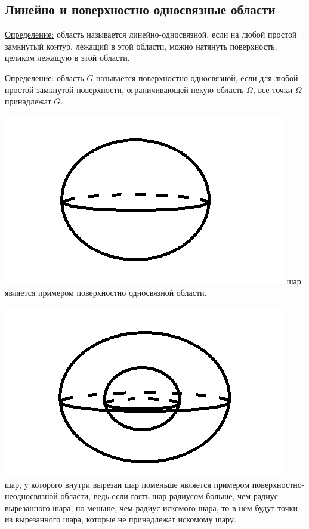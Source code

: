 \documentclass[12pt]{article}
\begin{document}
\subsection{Линейно и поверхностно односвязные области}
\uline{Определение:} область называется линейно-односвязной, если на любой простой замкнутый контур, лежащий в этой области, можно натянуть поверхность, целиком лежащую в этой области.\par
\uline{Определение:} область $G$ называется поверхностно-односвязной, если для любой простой замкнутой поверхности, ограничивающей некую область $\Omega$, все точки $\Omega$ принадлежат $G$.\par
\includegraphics{surfaceSingleConnected1}  шар является примером поверхностно односвязной области.\par
\includegraphics{surfaceNotSingleConnected1} - шар, у которого внутри вырезан шар поменьше является примером поверхностно-неодносвязной области, ведь если взять шар радиусом больше, чем радиус вырезанного шара, но меньше, чем радиус искомого шара, то в нем будут точки из вырезанного шара, которые не принадлежат искомому шару.\par
\end{document}
